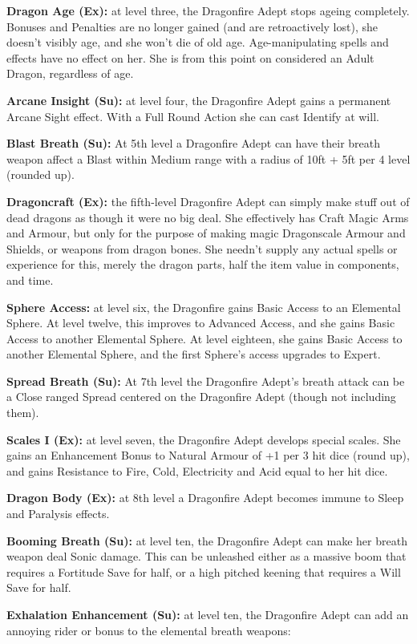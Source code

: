 \textbf{Dragon Age (Ex):} at level three, the Dragonfire Adept stops ageing completely. Bonuses and Penalties are no longer gained (and are retroactively lost), she doesn't visibly age, and she won't die of old age. Age-manipulating spells and effects have no effect on her. She is from this point on considered an Adult Dragon, regardless of age.

\textbf{Arcane Insight (Su):} at level four, the Dragonfire Adept gains a permanent Arcane Sight effect. With a Full Round Action she can cast Identify at will.

\textbf{Blast Breath (Su):} At 5th level a Dragonfire Adept can have their breath weapon affect a Blast within Medium range with a radius of 10ft + 5ft per 4 level (rounded up).

\textbf{Dragoncraft (Ex):} the fifth-level Dragonfire Adept can simply make stuff out of dead dragons as though it were no big deal. She effectively has Craft Magic Arms and Armour, but only for the purpose of making magic Dragonscale Armour and Shields, or weapons from dragon bones. She needn't supply any actual spells or experience for this, merely the dragon parts, half the item value in components, and time.

\textbf{Sphere Access:} at level six, the Dragonfire gains Basic Access to an Elemental Sphere. At level twelve, this improves to Advanced Access, and she gains Basic Access to another Elemental Sphere. At level eighteen, she gains Basic Access to another Elemental Sphere, and the first Sphere's access upgrades to Expert.

\textbf{Spread Breath (Su):} At 7th level the Dragonfire Adept's breath attack can be a Close ranged Spread centered on the Dragonfire Adept (though not including them).

\textbf{Scales I (Ex):} at level seven, the Dragonfire Adept develops special scales. She gains an Enhancement Bonus to Natural Armour of +1 per 3 hit dice (round up), and gains Resistance to Fire, Cold, Electricity and Acid equal to her hit dice.

\textbf{Dragon Body (Ex):} at 8th level a Dragonfire Adept becomes immune to Sleep and Paralysis effects.

\textbf{Booming Breath (Su):} at level ten, the Dragonfire Adept can make her breath weapon deal Sonic damage. This can be unleashed either as a massive boom that requires a Fortitude Save for half, or a high pitched keening that requires a Will Save for half.

\textbf{Exhalation Enhancement (Su):} at level ten, the Dragonfire Adept can add an annoying rider or bonus to the elemental breath weapons:


